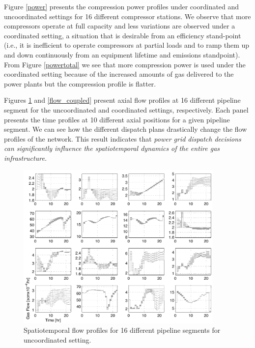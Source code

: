 \documentclass[11pt,twoside]{article}
\begin{document}
Figure \ref{power} presents the compression power profiles under coordinated and uncoordinated settings for 16 different compressor stations. We observe that more compressors operate at full capacity and less variations are observed under a coordinated setting, a situation that is desirable from an efficiency stand-point (i.e., it is inefficient to operate compressors at partial loads and to ramp them up and down continuously from an equipment lifetime and emissions standpoint). From Figure \ref{powertotal} we see that more compression power is used under the coordinated setting because of the increased amounts of gas delivered to the power plants but the compression profile is flatter. 

Figures  \ref{flow_uncoupled}  and \ref{flow_coupled} present axial flow profiles at 16 different pipeline segment for the uncoordinated and coordinated settings, respectively.  Each panel presents the time profiles at 10 different axial positions for a given pipeline segment.  We can see how the different dispatch plans drastically change the flow profiles of the network.  This result indicates that {\em power grid dispatch decisions can significantly influence the spatiotemporal dynamics of the entire gas infrastructure.} 

\begin{figure}[h!]
\begin{center}
\includegraphics[width=4in]{flow_decoupled.pdf}\caption{Spatiotemporal flow profiles for 16 different pipeline segments for uncoordinated setting.}\label{flow_uncoupled}
\end{center}
\end{figure}
\end{document}
